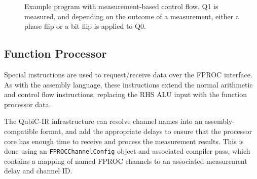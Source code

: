 \documentclass[journal]{IEEEtran}
\begin{document}
\begin{figure}

\caption{Example program with measurement-based control flow. Q1 is measured, and depending on the outcome of a measurement, either a phase flip or a bit flip is applied to Q0.}
\end{figure}

\subsection{Function Processor}

Special instructions are used to request/receive data over the FPROC interface. As with the assembly language, these instructions extend the normal arithmetic and control flow instructions, replacing the RHS ALU input with the function processor data. 

The QubiC-IR infrastructure can resolve channel names into an assembly-compatible format, and add the appropriate delays to ensure that the processor core has enough time to receive and process the measurement results. This is done using an \verb|FPROCChannelConfig| object and associated compiler pass, which contains a mapping of named FPROC channels to an associated measurement delay and channel ID.
\end{document}
